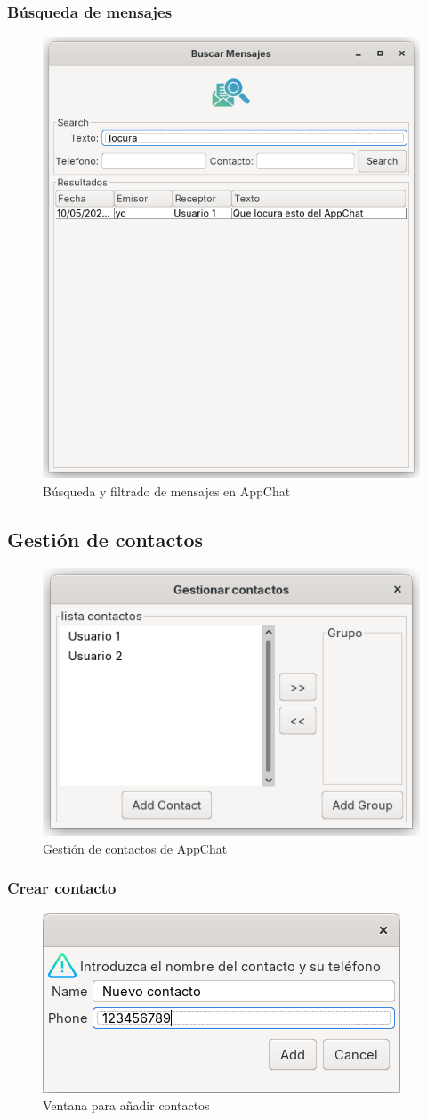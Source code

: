 \documentclass[11pt]{article}
\begin{document}
\subsubsection{Búsqueda de mensajes}

\begin{figure}[H]
	\centering
	\includegraphics[width=0.5\linewidth]{figures/search}
	\caption{Búsqueda y filtrado de mensajes en AppChat}
	\label{fig:search}
\end{figure}

\subsection{Gestión de contactos}

\begin{figure}[H]
	\centering
	\includegraphics[width=0.4\linewidth]{figures/manage-contacts}
	\caption{Gestión de contactos de AppChat}
	\label{fig:manage-contacts}
\end{figure}

\subsubsection{Crear contacto}

\begin{figure}[H]
	\centering
	\includegraphics[width=0.5\linewidth]{figures/add-contact}
	\caption{Ventana para añadir contactos}
	\label{fig:add-contact}
\end{figure}
\end{document}
